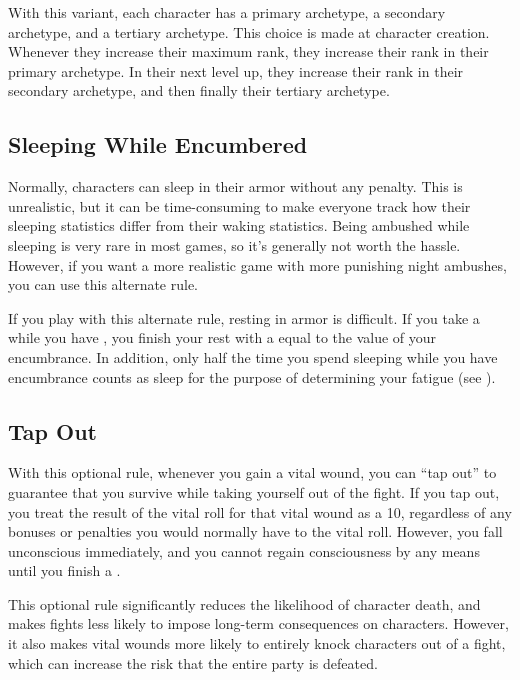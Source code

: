         With this variant, each character has a primary archetype, a secondary archetype, and a tertiary archetype.
        This choice is made at character creation.
        Whenever they increase their maximum rank, they increase their rank in their primary archetype.
        In their next level up, they increase their rank in their secondary archetype, and then finally their tertiary archetype.

    \subsection{Sleeping While Encumbered}
        Normally, characters can sleep in their armor without any penalty.
        This is unrealistic, but it can be time-consuming to make everyone track how their sleeping statistics differ from their waking statistics.
        Being ambushed while sleeping is very rare in most games, so it's generally not worth the hassle.
        However, if you want a more realistic game with more punishing night ambushes, you can use this alternate rule.

        If you play with this alternate rule, resting in armor is difficult.
        If you take a  while you have , you finish your rest with a  equal to the value of your encumbrance.
        In addition, only half the time you spend sleeping while you have encumbrance counts as sleep for the purpose of determining your fatigue (see ).

    \subsection{Tap Out}
        With this optional rule, whenever you gain a vital wound, you can ``tap out'' to guarantee that you survive while taking yourself out of the fight.
        If you tap out, you treat the result of the vital roll for that vital wound as a 10, regardless of any bonuses or penalties you would normally have to the vital roll.
        However, you fall unconscious immediately, and you cannot regain consciousness by any means until you finish a .

        This optional rule significantly reduces the likelihood of character death, and makes fights less likely to impose long-term consequences on characters.
        However, it also makes vital wounds more likely to entirely knock characters out of a fight, which can increase the risk that the entire party is defeated.

